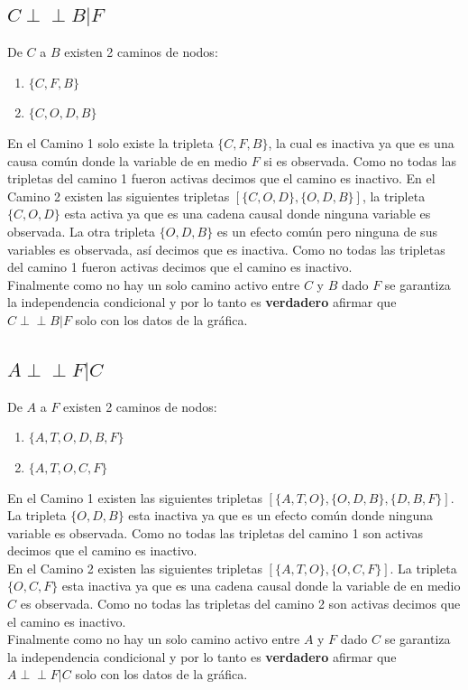 \documentclass[12pt]{article}
\begin{document}
\subsection{$C  \perp\!\!\!\perp B | F$}
De $C$ a $B$ existen 2 caminos de nodos:
\begin{enumerate}
	\item $\{C, F, B\}$
	\item $\{C, O, D, B\}$
\end{enumerate}
En el Camino 1 solo existe la tripleta $\{C,F,B\}$, la cual es inactiva ya que es una causa común donde la variable de en medio $F$ si es observada. Como no todas las tripletas del camino 1 fueron activas decimos que el camino es inactivo.
En el Camino 2 existen las siguientes tripletas $[\{C,O,D\},\{O,D,B\}]$, la tripleta $\{C,O,D\}$ esta activa ya que es una cadena causal donde ninguna variable es observada.
La otra tripleta $\{O,D,B\}$ es un efecto común pero ninguna de sus variables es observada, así decimos que es inactiva. Como no todas las tripletas del camino 1 fueron activas decimos que el camino es inactivo.\\
Finalmente como no hay un solo camino activo entre $C$ y $B$ dado $F$ se garantiza la independencia condicional y por lo tanto es \textbf{verdadero} afirmar que $C  \perp\!\!\!\perp B | F$ solo con los datos de la gráfica.
\subsection{$A  \perp\!\!\!\perp F | C$}
De $A$ a $F$ existen 2 caminos de nodos:
\begin{enumerate}
	\item $\{A, T, O, D, B, F\}$
	\item $\{A, T, O, C, F\}$
\end{enumerate}
En el Camino 1 existen las siguientes tripletas $[\{A,T,O\},\{O,D,B\},\{D,B,F\}]$. La tripleta $\{O,D,B\}$ esta inactiva ya que es un efecto común donde ninguna variable es observada. Como no todas las tripletas del camino 1 son activas decimos que el camino es inactivo.\\
En el Camino 2 existen las siguientes tripletas $[\{A,T,O\},\{O,C,F\}]$. La tripleta $\{O,C,F\}$ esta inactiva ya que es una cadena causal donde la variable de en medio $C$ es observada. Como no todas las tripletas del camino 2 son activas decimos que el camino es inactivo.\\
Finalmente como no hay un solo camino activo entre $A$ y $F$ dado $C$ se garantiza la independencia condicional y por lo tanto es \textbf{verdadero} afirmar que $A  \perp\!\!\!\perp F | C$ solo con los datos de la gráfica.
\end{document}
